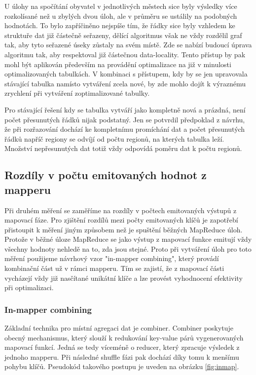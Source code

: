 \documentclass[thesis=M,czech]{FITthesis}[2012/06/26]
\begin{document}
U úlohy na spočítání obyvatel v jednotlivých městech sice byly výsledky více rozkolísané než u zbylých dvou úloh, ale v průměru se ustálily na podobných hodnotách. To bylo zapříčiněno nejspíše tím, že řádky sice byly vzhledem ke struktuře dat již částečně seřazeny, dělící algoritmus však ne vždy rozdělil graf tak, aby tyto seřazené úseky zůstaly na svém místě. Zde se nabízí budoucí úprava algoritmu tak, aby respektoval již částečnou data-locality. Tento přístup by pak mohl být aplikován především na provádění optimalizace na již v minulosti optimalizovaných tabulkách. V kombinaci s přístupem, kdy by se jen upravovala stávající tabulka namísto vytváření zcela nové, by zde mohlo dojít k výraznému zrychlení při vytváření zoptimalizované tabulky.

Pro stávající řešení kdy se tabulka vytváří jako kompletně nová a prázdná, není počet přesunutých řádků nijak podstatný. Jen se potvrdil předpoklad z návrhu, že při rozřazování dochází ke kompletnímu promíchání dat a počet přesunutých řádků napříč regiony se odvíjí od počtu regionů, na kterých tabulka leží. Množství nepřesunutých dat totiž vždy odpovídá poměru dat k počtu regionů.
 
\subsection{Rozdíly v počtu emitovaných hodnot z mapperu}
Při druhém měření se zaměříme na rozdíly v počtech emitovaných výstupů z mapovací fáze. Pro zjištění rozdílů mezi počty emitovaných klíčů je zapotřebí přistoupit k měření jiným způsobem než je spuštění běžných MapReduce úloh. Protože v běžné úloze MapReduce se jako výstup z mapovací funkce emitují vždy všechny hodnoty nehledě na to, zda jsou stejné. Proto při vytváření úloh pro toto měření použijeme návrhový vzor "in-mapper combining", který provádí kombinační část už v rámci mapperu. Tím se zajistí, že z mapovací části vycházejí vždy již nasčítané unikátní klíče a lze provést vyhodnocení efektivity při optimalizaci.

\subsubsection{In-mapper combining}
Základní technika pro místní agregaci dat je combiner. Combiner poskytuje obecný mechanismus, který slouží k redukování key-value párů vygenerovaných mapovací funkcí. Jedná se tedy víceméně o reducer, který zpracuje výsledek z jednoho mapperu. Při následné shuffle fázi pak dochází díky tomu k menšímu pohybu klíčů.\cite{inmemory}  Pseudokód takového postupu je uveden na obrázku \ref{fig:inmap}.
\end{document}

